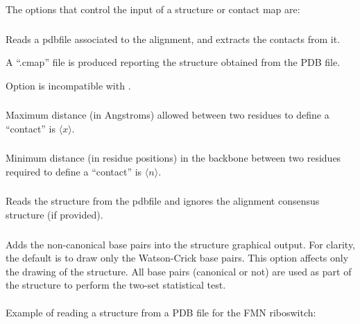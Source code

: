 \vspace{2mm}
\noindent
The options that control the input of a structure or contact map are:

\subsubsection{} Reads a pdbfile associated to the alignment, and extracts the contacts
from it.

A ``.cmap'' file is produced reporting the structure obtained from the PDB file.

Option  is incompatible with .

\subsubsection{} Maximum distance (in Angstroms) allowed between two residues to define a ``contact'' is $\langle x\rangle$.

\subsubsection{} Minimum distance (in residue positions) in the backbone between two residues required to define a ``contact'' is $\langle n\rangle$.
\vspace{5mm}

\subsubsection{} Reads the structure from the pdbfile and ignores the alignment consensus structure (if provided).

\subsubsection{} Adds the non-canonical base pairs into the structure graphical output. For clarity, the default is to draw only the Watson-Crick base pairs.
This option affects only the drawing of the structure. All base pairs (canonical or not) are used as part of the structure to perform the two-set statistical test.
\\\\

\noindent
Example of reading a structure from a PDB file for the FMN riboswitch:

\\

